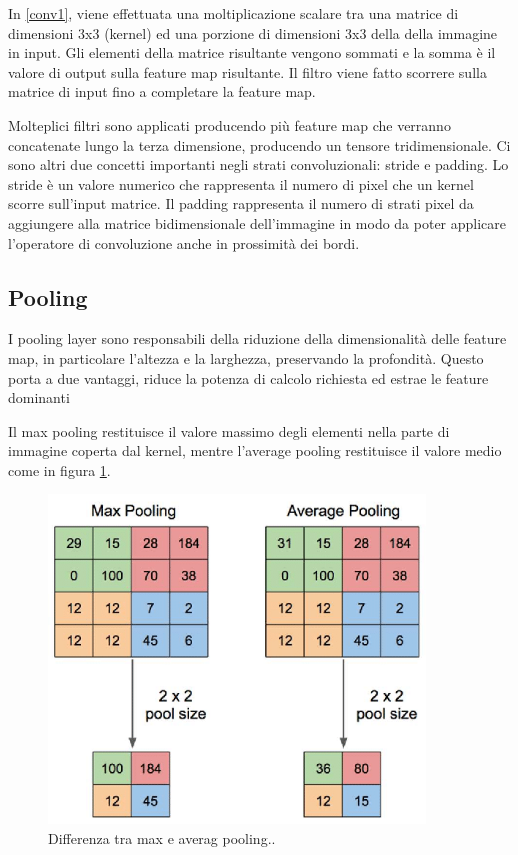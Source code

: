 In \ref{conv1}, viene effettuata una moltiplicazione scalare tra una matrice di dimensioni 3x3 (kernel) ed una porzione di dimensioni 3x3 della della immagine in input. Gli elementi della matrice risultante vengono sommati e la somma è il valore di output sulla feature map risultante. Il filtro viene fatto scorrere sulla matrice di input fino a completare la feature map. 

Molteplici filtri sono applicati producendo più feature map che verranno concatenate lungo la terza dimensione, producendo un tensore tridimensionale. Ci sono altri due concetti importanti negli strati convoluzionali: stride e padding. Lo stride è un valore numerico che rappresenta il numero di pixel che un kernel scorre sull'input matrice. Il padding  rappresenta il numero di strati pixel da aggiungere alla matrice bidimensionale dell'immagine in modo da poter applicare l'operatore di convoluzione anche in prossimità dei bordi.


\subsection{Pooling}
I pooling layer sono responsabili della riduzione della dimensionalità delle feature map, in particolare l'altezza e la larghezza, preservando la profondità. Questo porta a due vantaggi, riduce la potenza di calcolo richiesta ed estrae le feature dominanti 

Il max pooling restituisce il valore massimo degli elementi nella parte di immagine coperta dal kernel, mentre l'average pooling restituisce il valore medio come in figura \ref{pooling}.

\begin{figure}[H]
	\centering
	\includegraphics[width = 100mm]{images/pooling.png}
	\caption{Differenza tra max e averag pooling..}
	\label{pooling}
\end{figure}

